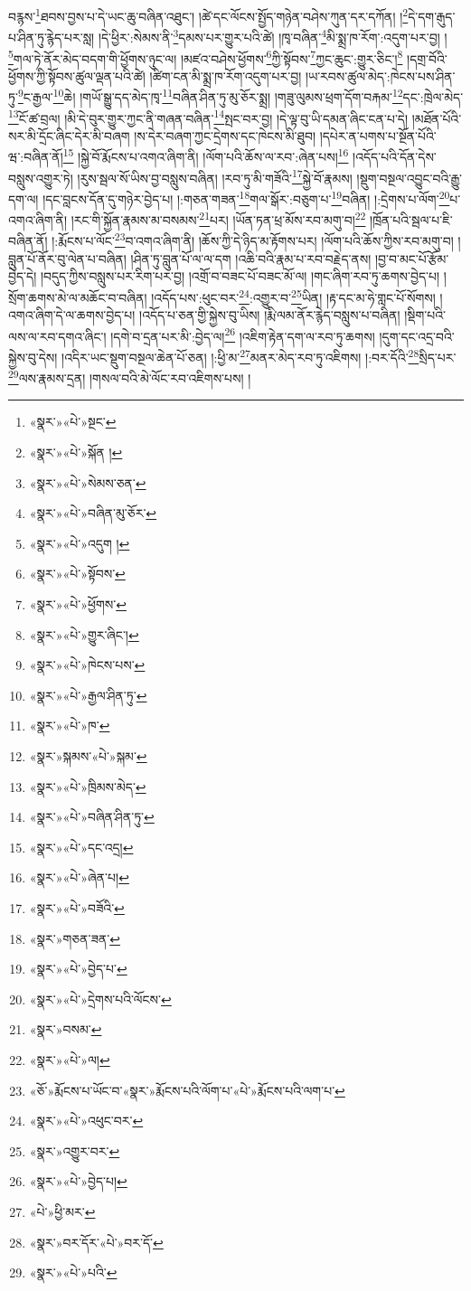 བརྙས་\footnote{«སྣར་»«པེ་»སྔང་}ཐབས་བྱས་པ་དེ་ཡང་ཆུ་བཞིན་འཐུང་། །ཚེ་དང་ལོངས་སྤྱོད་གཉེན་བཤེས་ཀུན་དར་དཀོན། །\footnote{«སྣར་»«པེ་»སྐོན །}དེ་དག་རྒུད་པ་ཤིན་ཏུ་རྙེད་པར་སླ། །དེ་ཕྱིར་:སེམས་ནི་\footnote{«སྣར་»«པེ་»སེམས་ཅན་}དམས་པར་གྱུར་པའི་ཚེ། །ཁྭ་བཞིན་\footnote{«སྣར་»«པེ་»བཞིན་མུ་ཅོར་}མི་སྨྲ་ཁ་རོག་:འདུག་པར་བྱ། །\footnote{«སྣར་»«པེ་»འདུག །}གལ་ཏེ་ནོར་མེད་བདག་གི་ཕྱོགས་ཉུང་ལ། །མཛའ་བཤེས་ཕྱོགས་\footnote{«སྣར་»«པེ་»སྟོབས་}ཀྱི་སྟོབས་\footnote{«སྣར་»«པེ་»ཕྱོགས་}ཀྱང་ཆུང་:གྱུར་ཅིང་།\footnote{«སྣར་»«པེ་»གྱུར་ཞིང་།} །དགྲ་བོའི་ཕྱོགས་ཀྱི་སྟོབས་ཚུལ་ལྡན་པའི་ཚེ། །ཚིག་ངན་མི་སྨྲ་ཁ་རོག་འདུག་པར་བྱ། །ཡ་རབས་ཚུལ་མེད་:ཁེངས་པས་ཤིན་ཏུ་\footnote{«སྣར་»«པེ་»ཁེངས་པས་}ང་རྒྱལ་\footnote{«སྣར་»«པེ་»རྒྱལ་ཤིན་ཏུ་}ཆེ། །གཡོ་སྒྱུ་དད་མེད་ཁྭ་\footnote{«སྣར་»«པེ་»ཁ་}བཞིན་ཤིན་ཏུ་མུ་ཅོར་སྨྲ། །གཟུ་ལུམས་ཕྲག་དོག་བརྐམ་\footnote{«སྣར་»སྐམས་«པེ་»སྐམ་}དང་:ཁྲེལ་མེད་\footnote{«སྣར་»«པེ་»ཁྲིམས་མེད་}ངོ་ཚ་བྲལ། །མི་དེ་བུར་གྱུར་ཀྱང་ནི་གཞན་བཞིན་\footnote{«སྣར་»«པེ་»བཞིན་ཤིན་ཏུ་}སྤང་བར་བྱ། །དེ་ལྟ་བུ་ཡི་དམན་ཞིང་ངན་པ་དེ། །མཐོན་པོའི་སར་མི་དྲོང་ཞིང་དེར་མི་བཞག །ས་དེར་བཞག་ཀྱང་དྲེགས་དང་ཁེངས་མི་ཐུབ། །དཔེར་ན་པགས་པ་སྔོན་པོའི་ཝ་:བཞིན་ནོ།\footnote{«སྣར་»«པེ་»དང་འདྲ།} །སྐྱེ་བོ་རྨོངས་པ་འགའ་ཞིག་ནི། །ལོག་པའི་ཆོས་ལ་རབ་:ཞེན་པས།\footnote{«སྣར་»«པེ་»ཞེན་པ།} །འདོད་པའི་དོན་དེས་བསླུས་འགྱུར་ཏེ། །རུས་སྦལ་སོ་ཡིས་བྱ་བསླུས་བཞིན། །རབ་ཏུ་མི་གཟོའི་\footnote{«སྣར་»«པེ་»བཟོའི་}སྐྱེ་བོ་རྣམས། །སྡུག་བསྔལ་འབྱུང་བའི་རྒྱུ་དག་ལ། །དང་བླངས་དོན་དུ་གཉེར་བྱེད་པ། །:གཅན་གཟན་\footnote{«སྣར་»གཅན་ཟན་}གལ་སྒོར་:བཅུག་པ་\footnote{«སྣར་»«པེ་»བྱེད་པ་}བཞིན། །:དྲེགས་པ་ལོག་\footnote{«སྣར་»«པེ་»དྲེགས་པའི་ལོངས་}པ་འགའ་ཞིག་ནི། །རང་གི་སྐྱོན་རྣམས་མ་བསམས་\footnote{«སྣར་»བསམ་}པར། །ཡོན་ཏན་ཕྲ་མོས་རབ་མགུ་བ།\footnote{«སྣར་»«པེ་»ལ།} །ཁྲོན་པའི་སྦལ་པ་ཇི་བཞིན་ནོ། །:རྨོངས་པ་ལོང་\footnote{«ཅོ་»རྨོངས་པ་ཡོང་བ་«སྣར་»རྨོངས་པའི་ལོག་པ་«པེ་»རྨོངས་པའི་ལག་པ་}བ་འགའ་ཞིག་ནི། །ཆོས་ཀྱི་དེ་ཉིད་མ་རྟོགས་པར། །ལོག་པའི་ཆོས་ཀྱིས་རབ་མགུ་བ། །བླུན་པོ་ནོར་བུ་ལེན་པ་བཞིན། །ཤིན་ཏུ་བླུན་པོ་ལ་ལ་དག །འཆི་བའི་རྣམ་པ་རབ་བརྗེད་ནས། །བྱ་བ་མང་པོ་རྩོམ་བྱེད་དེ། །བདུད་ཀྱིས་བསླུས་པར་རིག་པར་བྱ། །འགྲོ་བ་བཟང་པོ་བཟང་མོ་ལ། །གང་ཞིག་རབ་ཏུ་ཆགས་བྱེད་པ། །སྲོག་ཆགས་མེ་ལ་མཆོང་བ་བཞིན། །འདོད་པས་:ཕུང་བར་\footnote{«སྣར་»«པེ་»འཕུང་བར་}:འགྱུར་བ་\footnote{«སྣར་»འགྱུར་བར་}ཡིན། །རྟ་དང་མ་ཧེ་གླང་པོ་སོགས། །འགའ་ཞིག་དེ་ལ་ཆགས་བྱེད་པ། །འདོད་པ་ཅན་གྱི་སྐྱེས་བུ་ཡིས། །རྨི་ལམ་ནོར་རྙེད་བསླུས་པ་བཞིན། །སྡིག་པའི་ལས་ལ་རབ་དགའ་ཞིང་། །དགེ་བ་དྲན་པར་མི་:བྱེད་ལ།\footnote{«སྣར་»«པེ་»བྱེད་པ།} །འཇིག་རྟེན་དག་ལ་རབ་ཏུ་ཆགས། །དུག་དང་འདྲ་བའི་སྐྱེས་བུ་དེས། །འདིར་ཡང་སྡུག་བསྔལ་ཆེན་པོ་ཅན། །:ཕྱི་མ་\footnote{«པེ་»ཕྱི་མར་}མནར་མེད་རབ་ཏུ་འཇིགས། །:བར་དོའི་\footnote{«སྣར་»བར་དོར་«པེ་»བར་དོ་}སྲིད་པར་\footnote{«སྣར་»«པེ་»པའི་}ལས་རྣམས་དྲན། །གསལ་བའི་མེ་ལོང་རབ་འཇིགས་པས། །
